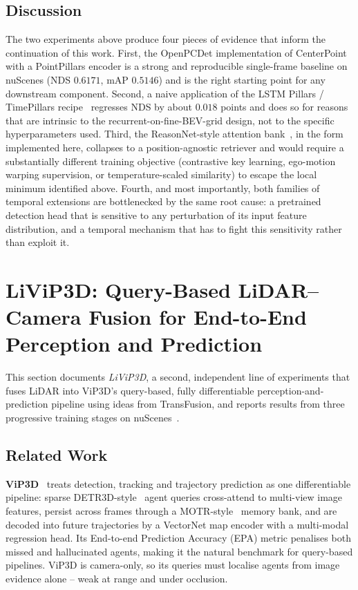 \documentclass[12pt,a4paper]{report}
\begin{document}
\subsection{Discussion}
\quad The two experiments above produce four pieces of evidence
that inform the continuation of this work. First, the OpenPCDet
implementation of CenterPoint with a PointPillars encoder is a
strong and reproducible single-frame baseline on nuScenes (NDS
$0.6171$, mAP $0.5146$) and is the right starting point for any
downstream component. Second, a naive application of the LSTM
Pillars / TimePillars recipe~\cite{Huang2020LSTMPillars,Hammarstrand2024TimePillars} regresses NDS by about $0.018$ points
and does so for reasons that are intrinsic to the
recurrent-on-fine-BEV-grid design, not to the specific
hyperparameters used. Third, the ReasonNet-style attention bank~\cite{Shao2023ReasonNet},
in the form implemented here, collapses to a position-agnostic
retriever and would require a substantially different training
objective (contrastive key learning, ego-motion warping
supervision, or temperature-scaled similarity) to escape the
local minimum identified above. Fourth, and most importantly,
both families of temporal extensions are bottlenecked by the same
root cause: a pretrained detection head that is 
sensitive to any perturbation of its input feature distribution,
and a temporal mechanism that has to fight this sensitivity
rather than exploit it.




\section{LiViP3D: Query-Based LiDAR--Camera Fusion for End-to-End Perception and Prediction}

\quad This section documents \emph{LiViP3D}, a second, independent line of experiments that fuses LiDAR into ViP3D's query-based, fully differentiable perception-and-prediction pipeline using ideas from TransFusion, and reports results from three progressive training stages on nuScenes~\cite{Caesar2020nuScenes}.

\subsection{Related Work}
\quad \textbf{ViP3D}~\cite{Gu2023ViP3D} treats detection, tracking and trajectory prediction as one differentiable pipeline: sparse DETR3D-style~\cite{Wang2021DETR3D} agent queries cross-attend to multi-view image features, persist across frames through a MOTR-style~\cite{Zeng2022MOTR} memory bank, and are decoded into future trajectories by a VectorNet map encoder with a multi-modal regression head. Its End-to-end Prediction Accuracy (EPA) metric penalises both missed and hallucinated agents, making it the natural benchmark for query-based pipelines. ViP3D is camera-only, so its queries must localise agents from image evidence alone -- weak at range and under occlusion.
\end{document}
